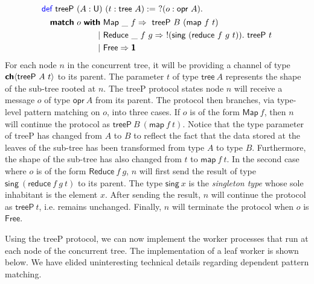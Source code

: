\vspace{-1em}
\begingroup
\small
\addtolength{\jot}{-0.25em}
\begin{alignat*}{4}
  &\Def\ \textsf{treeP}\ (A : \Un)\ (t : \textsf{tree}\ A) :=\ ?(o : \textsf{opr}\ A).\\
  &\quad
    \begin{alignedat}{4}
      \Match\ o\ \With&\ \textsf{Map}\ \_\ f \Rightarrow\ \textsf{treeP}\ B\ (\textsf{map}\ f\ t) \\
                  \mid&\ \textsf{Reduce}\ \_\ f\ g \Rightarrow\ !(\textsf{sing}\ (\textsf{reduce}\ f\ g\ t)).\ \textsf{treeP}\ t \\
                  \mid&\ \textsf{Free} \Rightarrow \End
    \end{alignedat}
\end{alignat*}
\endgroup
For each node $n$ in the concurrent tree, it will be providing a channel of type
${\textbf{\textsf{ch}}\langle{\textsf{treeP}\ A\ t}\rangle}$ to its parent. The parameter $t$ of type
$\textsf{tree}\ A$ represents the shape of the sub-tree rooted at $n$. The
\textsf{treeP} protocol states node $n$ will receive a message $o$ of type
$\textsf{opr}\ A$ from its parent.  The protocol then branches, via type-level
pattern matching on $o$, into three cases. If $o$ is of the form
$\textsf{Map}\ f$, then $n$ will continue the protocol as
$\textsf{treeP}\ B\ (\textsf{map}\ f\ t)$. Notice that the type parameter of
\textsf{treeP} has changed from $A$ to $B$ to reflect the fact that the data
stored at the leaves of the sub-tree has been transformed from type $A$ to type
$B$. Furthermore, the shape of the sub-tree has also changed from $t$ to
$\textsf{map}\ f\ t$. In the second case where $o$ is of the form
$\textsf{Reduce}\ f\ g$, $n$ will first send the result of type
$\textsf{sing}\ (\textsf{reduce}\ f\ g\ t)$ to its parent. The type
$\textsf{sing}\ x$ is the \emph{singleton type} whose sole inhabitant is the
element $x$. After sending the result, $n$ will continue the protocol as
$\textsf{treeP}\ t$, i.e. remains unchanged. Finally, $n$ will terminate
the protocol when $o$ is $\textsf{Free}$.

Using the \textsf{treeP} protocol, we can now implement the worker processes
that run at each node of the concurrent tree. The implementation of a leaf worker
is shown below. We have elided uninteresting technical details regarding dependent
pattern matching.

